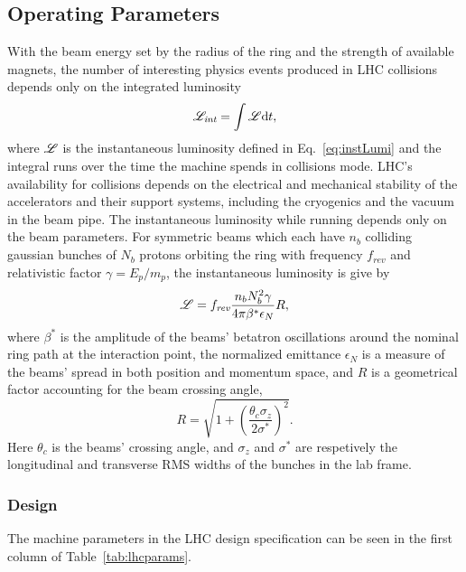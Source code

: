 \subsection{Operating Parameters}
With the beam energy set by the radius of the ring and the strength of available magnets, the number of interesting physics events produced in LHC collisions depends only on the integrated luminosity
\begin{equation}
  \mathscr{L}_\textit{int} = \int \mathscr{L} \mathrm{d}t,
\end{equation}
where $\mathscr{L}$ is the instantaneous luminosity defined in Eq.~\ref{eq:instLumi} and the integral runs over the time the machine spends in collisions mode.
LHC's availability for collisions depends on the electrical and mechanical stability of the accelerators and their support systems, including the cryogenics and the vacuum in the beam pipe.
The instantaneous luminosity while running depends only on the beam parameters.
For symmetric beams which each have $n_b$ colliding gaussian bunches of $N_b$ protons orbiting the ring with frequency $f_\textit{rev}$ and relativistic factor $\gamma=E_p/m_p$, the instantaneous luminosity is give by
\begin{equation}
  \mathscr{L} = f_\textit{rev} \frac{n_b N_b^2 \gamma}{4\pi \beta^\ast \epsilon_N} R,
\end{equation}
where $\beta^\ast$ is the amplitude of the beams' betatron oscillations around the nominal ring path at the interaction point, the normalized emittance $\epsilon_N$ is a measure of the beams' spread in both position and momentum space, and $R$ is a geometrical factor accounting for the beam crossing angle,
\begin{equation}
  R = \sqrt{1 + \left(\frac{\theta_c \sigma_z}{2\sigma^\ast}\right)^2}.
\end{equation}
Here $\theta_c$ is the beams' crossing angle, and $\sigma_z$ and $\sigma^\ast$ are respetively the longitudinal and transverse RMS widths of the bunches in the lab frame.


\subsubsection{Design}
The machine parameters in the LHC design specification can be seen in the first column of Table~\ref{tab:lhcparams}.


